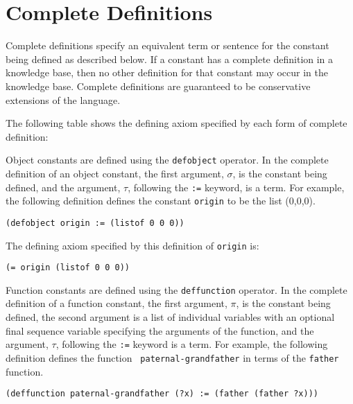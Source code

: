 \section{Complete Definitions}

Complete definitions specify an equivalent term or sentence for the constant 
being defined as described below.  If a constant has a complete definition in
a 
knowledge base, then no other definition for that constant may occur in the 
knowledge base.  Complete definitions are guaranteed to be conservative 
extensions of the language.

The following table shows the defining axiom specified by each form of
complete definition:

\medskip
\centerline{\vbox{}}\medskip

Object constants are defined using the {\tt defobject} operator.  In the
complete definition of an object constant, the first argument, $\sigma$, is
the constant being defined, and the argument, $\tau$, following the {\tt :=}
keyword, is a term.  For example, the following definition defines the
constant {\tt origin} to be the list (0,0,0).

\medskip
{\tt (defobject origin := (listof 0 0 0))}
\medskip

The defining axiom specified by this definition of {\tt origin} is:

\medskip
{\tt (= origin (listof 0 0 0))}
\medskip

Function constants are defined using the {\tt deffunction} operator.  In the
complete definition of a function constant, the first argument, $\pi$, is the
constant being defined, the second argument is a list of individual variables
with an optional final sequence variable specifying the arguments of the
function, and the argument, $\tau$, following the {\tt :=} keyword is a term. 
For example, the following definition defines the function {\tt
paternal-grandfather} in terms of the {\tt father} function.

\medskip
{\tt (deffunction paternal-grandfather (?x) := (father (father ?x)))}
\medskip

